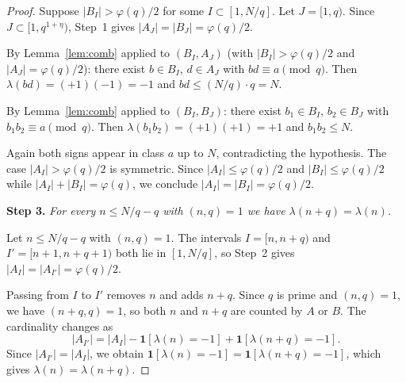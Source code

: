 \documentclass[10pt,a4paper]{amsart}
\begin{document}
\begin{proof}
\smallskip
Suppose $|B_I| > \varphi(q)/2$ for some
$I \subset [1, N/q]$.
Let $J = [1, q)$.
Since $J \subset [1, q^{1 + \eta})$,
Step~1 gives $|A_J| = |B_J| = \varphi(q)/2$.

By Lemma~\ref{lem:comb} applied to $(B_I, A_J)$
(with $|B_I| > \varphi(q)/2$ and $|A_J| = \varphi(q)/2$):
there exist $b \in B_I$, $d \in A_J$
with $bd \equiv a \pmod{q}$.
Then $\lambda(bd) = (+1)(-1) = -1$ and
$bd \leq (N/q) \cdot q = N$.

By Lemma~\ref{lem:comb} applied to $(B_I, B_J)$:
there exist $b_1 \in B_I$, $b_2 \in B_J$ with
$b_1 b_2 \equiv a \pmod{q}$.
Then $\lambda(b_1 b_2) = (+1)(+1) = +1$ and
$b_1 b_2 \leq N$.

Again both signs appear in class $a$ up to $N$,
contradicting the hypothesis.
The case $|A_I| > \varphi(q)/2$ is symmetric.
Since $|A_I| \leq \varphi(q)/2$ and $|B_I| \leq \varphi(q)/2$
while $|A_I| + |B_I| = \varphi(q)$,
we conclude $|A_I| = |B_I| = \varphi(q)/2$.

\medskip
\noindent\textbf{Step 3.}
\textit{For every $n \leq N/q - q$ with $(n,q) = 1$
we have $\lambda(n+q) = \lambda(n)$.}

\smallskip
Let $n \leq N/q - q$ with $(n, q) = 1$.
The intervals
$I = [n, n + q)$ and $I' = [n + 1, n + q + 1)$
both lie in $[1, N/q]$, so Step~2 gives
$|A_I| = |A_{I'}| = \varphi(q)/2$.

Passing from $I$ to $I'$ removes $n$ and adds $n + q$.
Since $q$ is prime and $(n, q) = 1$, we have
$(n + q, q) = 1$, so both $n$ and $n + q$ are counted
by $A$ or $B$.
The cardinality changes as
\[
|A_{I'}| = |A_I|
  - \mathbf{1}[\lambda(n) = -1]
  + \mathbf{1}[\lambda(n + q) = -1].
\]
Since $|A_{I'}| = |A_I|$, we obtain
$\mathbf{1}[\lambda(n) = -1] = \mathbf{1}[\lambda(n+q) = -1]$,
which gives $\lambda(n) = \lambda(n + q)$.
\end{proof}
\end{document}
